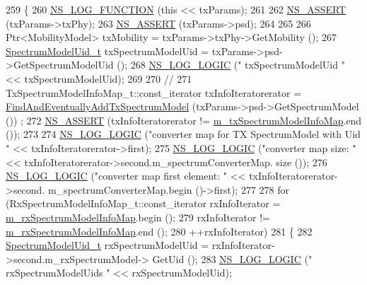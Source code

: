 \begin{DoxyCode}
259 \{
260   \hyperlink{log-macros-disabled_8h_a90b90d5bad1f39cb1b64923ea94c0761}{NS\_LOG\_FUNCTION} (\textcolor{keyword}{this} << txParams);
261 
262   \hyperlink{assert_8h_a6dccdb0de9b252f60088ce281c49d052}{NS\_ASSERT} (txParams->txPhy);
263   \hyperlink{assert_8h_a6dccdb0de9b252f60088ce281c49d052}{NS\_ASSERT} (txParams->psd);
264 
265 
266   Ptr<MobilityModel> txMobility = txParams->txPhy->GetMobility ();
267   \hyperlink{namespacens3_a5bf0e89b3407bbb59c90a4d8c4cf0a18}{SpectrumModelUid\_t} txSpectrumModelUid = txParams->psd->GetSpectrumModelUid ();
268   \hyperlink{group__logging_ga88acd260151caf2db9c0fc84997f45ce}{NS\_LOG\_LOGIC} (\textcolor{stringliteral}{" txSpectrumModelUid "} << txSpectrumModelUid);
269 
270   \textcolor{comment}{//}
271   TxSpectrumModelInfoMap\_t::const\_iterator txInfoIteratorerator = 
      \hyperlink{classns3_1_1MultiModelSpectrumChannel_a6056692c09015bd3d81df0d536a804c5}{FindAndEventuallyAddTxSpectrumModel} (txParams->psd->GetSpectrumModel ())
      ;
272   \hyperlink{assert_8h_a6dccdb0de9b252f60088ce281c49d052}{NS\_ASSERT} (txInfoIteratorerator != \hyperlink{classns3_1_1MultiModelSpectrumChannel_a401a74579865429a5008431e9000a8be}{m\_txSpectrumModelInfoMap}.end ());
273 
274   \hyperlink{group__logging_ga88acd260151caf2db9c0fc84997f45ce}{NS\_LOG\_LOGIC} (\textcolor{stringliteral}{"converter map for TX SpectrumModel with Uid "} << txInfoIteratorerator->first);
275   \hyperlink{group__logging_ga88acd260151caf2db9c0fc84997f45ce}{NS\_LOG\_LOGIC} (\textcolor{stringliteral}{"converter map size: "} << txInfoIteratorerator->second.m\_spectrumConverterMap.
      size ());
276   \hyperlink{group__logging_ga88acd260151caf2db9c0fc84997f45ce}{NS\_LOG\_LOGIC} (\textcolor{stringliteral}{"converter map first element: "} << txInfoIteratorerator->second.
      m\_spectrumConverterMap.begin ()->first);
277 
278   \textcolor{keywordflow}{for} (RxSpectrumModelInfoMap\_t::const\_iterator rxInfoIterator = 
      \hyperlink{classns3_1_1MultiModelSpectrumChannel_af75faef47b2e879fd82de7364ac2bcd0}{m\_rxSpectrumModelInfoMap}.begin ();
279        rxInfoIterator != \hyperlink{classns3_1_1MultiModelSpectrumChannel_af75faef47b2e879fd82de7364ac2bcd0}{m\_rxSpectrumModelInfoMap}.end ();
280        ++rxInfoIterator)
281     \{
282       \hyperlink{namespacens3_a5bf0e89b3407bbb59c90a4d8c4cf0a18}{SpectrumModelUid\_t} rxSpectrumModelUid = rxInfoIterator->second.m\_rxSpectrumModel->
      GetUid ();
283       \hyperlink{group__logging_ga88acd260151caf2db9c0fc84997f45ce}{NS\_LOG\_LOGIC} (\textcolor{stringliteral}{" rxSpectrumModelUids "} << rxSpectrumModelUid);

\end{DoxyCode}

